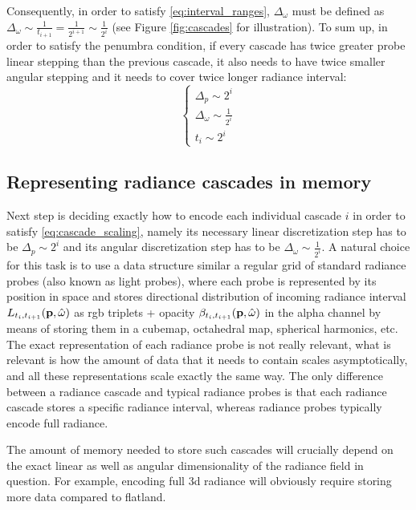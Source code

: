 \documentclass{jcgt}
\begin{document}
Consequently, in order to satisfy \ref{eq:interval_ranges}, $\Delta_\omega$ must be defined as $\Delta_\omega\sim\frac{1}{t_{i+1}}=\frac{1}{2^{i+1}}\sim \frac{1}{2^i}$ (see Figure \ref{fig:cascades} for illustration). To sum up, in order to satisfy the penumbra condition, if every cascade has twice greater probe linear stepping than the previous cascade, it also needs to have twice smaller angular stepping and it needs to cover twice longer radiance interval:
\begin{equation}
  \begin{cases}
    \Delta_p\sim2^i \\
    \Delta_\omega\sim \frac{1}{2^i} \\
    t_i\sim2^i
  \end{cases}
  \label{eq:cascade_scaling}
\end{equation}


\subsection{Representing radiance cascades in memory}
  
Next step is deciding exactly how to encode each individual cascade $i$ in order to satisfy \ref{eq:cascade_scaling}, namely its necessary linear discretization step has to be $\Delta_p \sim 2^i$ and its angular discretization step has to be $\Delta_\omega\sim\frac{1}{2^i}$. A natural choice for this task is to use a data structure similar a regular grid of standard radiance probes (also known as light probes), where each probe is represented by its position in space and stores directional distribution of incoming radiance interval $L_{t_i, t_{i+1}}(\textbf p, \hat \omega)$ as rgb triplets + opacity $\beta_{t_i, t_{i+1}}(\textbf p, \hat \omega)$ in the alpha channel by means of storing them in a cubemap, octahedral map, spherical harmonics, etc. The exact representation of each radiance probe is not really relevant, what is relevant is how the amount of data that it needs to contain scales asymptotically, and all these representations scale exactly the same way. The only difference between a radiance cascade and typical radiance probes is that each radiance cascade stores a specific radiance interval, whereas radiance probes typically encode full radiance.


The amount of memory needed to store such cascades will crucially depend on the exact linear as well as angular dimensionality of the radiance field in question. 
For example, encoding full 3d radiance will obviously require storing more data compared to flatland.
\end{document}
